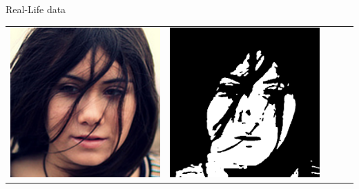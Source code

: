 \documentclass{beamer}
\begin{document}
\begin{frame}[c]{Real-Life data}
\begin{table}[h!]
\begin{tabular}{ | m{1.8cm} | m{1.8cm} | m{1.8cm}| m{1.8cm} | m{1.8cm} |}
			\begin{minipage}{1.8cm}
				\centering
				\vspace{1pt}
				\includegraphics[width=\linewidth]{realLife/test8.png}
				\vspace{1pt}
			\end{minipage}
			&
			\begin{minipage}{1.8cm}
				\centering
				\vspace{1pt}
				\includegraphics[width=\linewidth]{realLife/test8_mask_EGGER_.png}

\end{minipage}
\end{tabular}
\end{table}
\end{frame}
\end{document}
